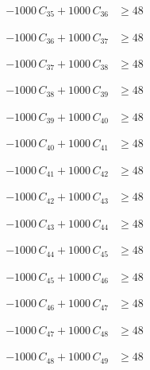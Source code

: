 \documentclass[a4paper,11pt]{article}
\begin{document}
\begin{align}
-1000\,C_{35} + 1000\,C_{36} &\geq 48 \nonumber
\end{align}

\begin{align}
-1000\,C_{36} + 1000\,C_{37} &\geq 48 \nonumber
\end{align}

\begin{align}
-1000\,C_{37} + 1000\,C_{38} &\geq 48 \nonumber
\end{align}

\begin{align}
-1000\,C_{38} + 1000\,C_{39} &\geq 48 \nonumber
\end{align}

\begin{align}
-1000\,C_{39} + 1000\,C_{40} &\geq 48 \nonumber
\end{align}

\begin{align}
-1000\,C_{40} + 1000\,C_{41} &\geq 48 \nonumber
\end{align}

\begin{align}
-1000\,C_{41} + 1000\,C_{42} &\geq 48 \nonumber
\end{align}

\begin{align}
-1000\,C_{42} + 1000\,C_{43} &\geq 48 \nonumber
\end{align}

\begin{align}
-1000\,C_{43} + 1000\,C_{44} &\geq 48 \nonumber
\end{align}

\begin{align}
-1000\,C_{44} + 1000\,C_{45} &\geq 48 \nonumber
\end{align}

\begin{align}
-1000\,C_{45} + 1000\,C_{46} &\geq 48 \nonumber
\end{align}

\begin{align}
-1000\,C_{46} + 1000\,C_{47} &\geq 48 \nonumber
\end{align}

\begin{align}
-1000\,C_{47} + 1000\,C_{48} &\geq 48 \nonumber
\end{align}

\begin{align}
-1000\,C_{48} + 1000\,C_{49} &\geq 48 \nonumber
\end{align}
\end{document}
